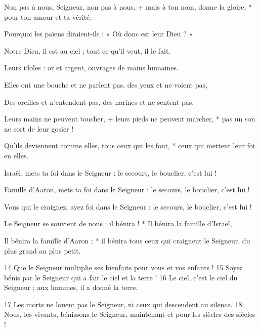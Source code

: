 \item Non pas à nous, Seigneur, non pas à nous, +
mais à ton nom, donne la gloire, *
pour ton amour et ta vérité.

\item Pourquoi les païens diraient-ils :
« Où donc est leur Dieu ? »

\item Notre Dieu, il est au ciel ;
tout ce qu'il veut, il le fait.

\item Leurs idoles : or et argent,
ouvrages de mains humaines.

\item  Elles ont une bouche et ne parlent pas,
des yeux et ne voient pas,

\item Des oreilles et n'entendent pas,
des narines et ne sentent pas.

\item Leurs mains ne peuvent toucher, +
leurs pieds ne peuvent marcher, *
pas un son ne sort de leur gosier !

\item Qu'ils deviennent comme elles,
tous ceux qui les font, *
ceux qui mettent leur foi en elles.

\item Israël, mets ta foi dans le Seigneur :
le secours, le bouclier, c'est lui !

\item Famille d'Aaron, mets ta foi dans le Seigneur :
le secours, le bouclier, c'est lui !

\item Vous qui le craignez, ayez foi dans le Seigneur :
le secours, le bouclier, c'est lui !

\item Le Seigneur se souvient de nous : il bénira ! *
Il bénira la famille d'Israël,

\item Il bénira la famille d'Aaron ; *
il bénira tous ceux qui craignent le Seigneur,
du plus grand au plus petit.

14 Que le Seigneur multiplie ses bienfaits
pour vous et vos enfants !
15 Soyez bénis par le Seigneur
qui a fait le ciel et la terre !
16 Le ciel, c'est le ciel du Seigneur ;
aux hommes, il a donné la terre.

17 Les morts ne louent pas le Seigneur,
ni ceux qui descendent au silence.
18 Nous, les vivants, bénissons le Seigneur,
maintenant et pour les siècles des siècles !
